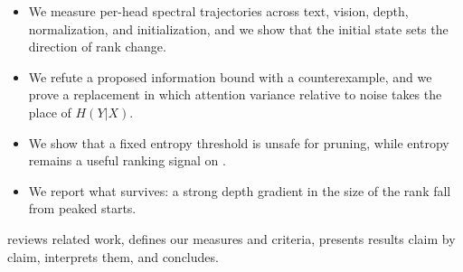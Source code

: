 \begin{table}[t]
    \centering
    \small
    \renewcommand{\arraystretch}{1.15}
    \caption{The five claims and our verdicts. A claim counts as supported in a configuration if its prespecified criterion holds in at least 80\% of seeds.}
    \label{tab:claims}
\end{table}

\begin{itemize}[leftmargin=*,itemsep=0pt,topsep=0pt]
    \item We measure per-head spectral trajectories across text, vision, depth, normalization, and initialization, and we show that the initial state sets the direction of rank change.
    \item We refute a proposed information bound with a counterexample, and we prove a replacement in which attention variance relative to noise takes the place of $H(Y|X)$.
    \item We show that a fixed entropy threshold is unsafe for pruning, while entropy remains a useful ranking signal on \cifar.
    \item We report what survives: a strong depth gradient in the size of the rank fall from peaked starts.
\end{itemize}

  reviews related work,  defines our measures and criteria,  presents results claim by claim,  interprets them, and  concludes.
